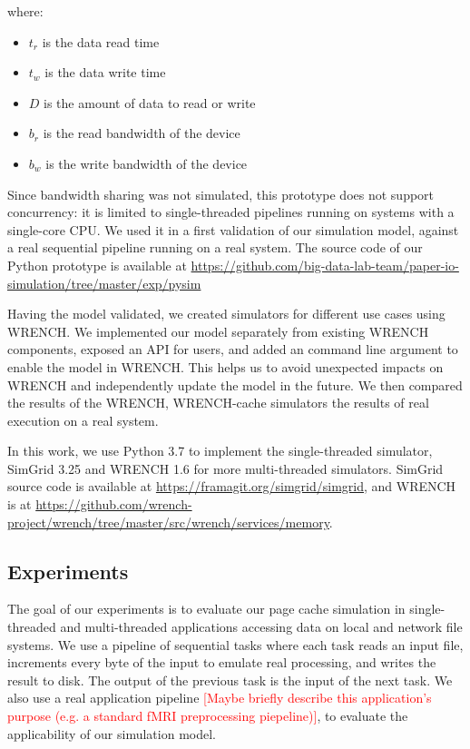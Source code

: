 \documentclass[conference]{IEEEtran}
\begin{document}
            where:
            \begin{itemize}
                \item $t_{r}$ is the data read time
                \item $t_{w}$ is the data write time
                \item $D$ is the amount of data to read or write
                \item $b_r$ is the read bandwidth of the device
                \item $b_w$ is the write bandwidth of the device
            \end{itemize}            

            Since bandwidth sharing was not simulated, this prototype does not support
            concurrency: it is limited to single-threaded pipelines running on systems
            with a single-core CPU. We used it in a first validation of our simulation
            model, against a real sequential pipeline running on a real system.
            The source code of our Python prototype is available at
            \url{https://github.com/big-data-lab-team/paper-io-simulation/tree/master/exp/pysim}

            Having the model validated, we created simulators for different use cases
            using WRENCH.
            We implemented our model separately from existing WRENCH components,
            exposed an API for users, and added an command line argument to enable
            the model in WRENCH.
            This helps us to avoid unexpected impacts on WRENCH and
            independently update the model in the future.
            We then compared the results of the WRENCH, WRENCH-cache simulators
            the results of real execution on a real system.

            In this work, we use Python 3.7 to implement the single-threaded simulator,
            SimGrid 3.25 and WRENCH 1.6 for more multi-threaded simulators.
            SimGrid source code is available at \url{https://framagit.org/simgrid/simgrid},
            and WRENCH is at
            \url{https://github.com/wrench-project/wrench/tree/master/src/wrench/services/memory}.

        \subsection{Experiments}

            The goal of our experiments is to evaluate our page cache
            simulation in single-threaded and multi-threaded applications
            accessing data on local and network file systems.
            We use a pipeline of sequential tasks where each task reads an input file,
            increments every byte of the input to emulate real processing, and writes
            the result to disk.
            The output of the previous task is the input of the next task.
            We also use a real application pipeline \textcolor{red}{[Maybe briefly describe this application's purpose (e.g. a standard fMRI preprocessing piepeline)]},
            to evaluate the applicability of our simulation model.
\end{document}
